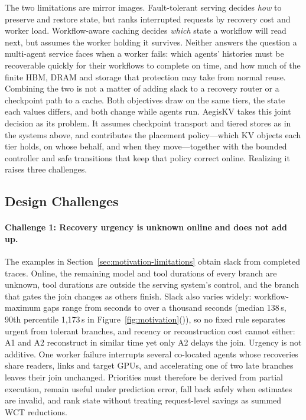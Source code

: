 \label{sec:motivation-long-context}
The two limitations are mirror images. Fault-tolerant serving decides
\emph{how} to preserve and restore state, but ranks interrupted requests
by recovery cost and worker load. Workflow-aware caching decides
\emph{which} state a workflow will read next, but assumes the worker
holding it survives. Neither answers the question a multi-agent service
faces when a worker fails: which agents' histories must be recoverable
quickly for their workflows to complete on time, and how much of the
finite HBM, DRAM and storage that protection may take from normal reuse.
Combining the two is not a matter of adding slack to a recovery router
or a checkpoint path to a cache. Both objectives draw on the same tiers,
the state each values differs, and both change while agents run.
AegisKV takes this joint decision as its problem. It assumes checkpoint
transport and tiered stores as in the systems above, and contributes the
placement policy---which KV objects each tier holds, on whose behalf,
and when they move---together with the bounded controller and safe
transitions that keep that policy correct online. Realizing it raises
three challenges.

\subsection{Design Challenges}
\label{sec:motivation-challenges}

\paragraph{Challenge 1: Recovery urgency is unknown online and does not add up.}
The examples in Section~\ref{sec:motivation-limitations} obtain slack
from completed traces. Online, the remaining model and tool durations of
every branch are unknown, tool durations are outside the serving
system's control, and the branch that gates the join changes as others
finish. Slack also varies widely: workflow-maximum gaps range from
seconds to over a thousand seconds (median 138\,s, 90th percentile
1,173\,s in Figure~\ref{fig:motivation}()),
so no fixed rule separates urgent from tolerant branches, and recency or
reconstruction cost cannot either: A1 and A2 reconstruct in similar time
yet only A2 delays the join. Urgency is not additive. One worker failure
interrupts several co-located agents whose recoveries share readers,
links and target GPUs, and accelerating one of two late branches leaves
their join unchanged. Priorities must therefore be derived from partial
execution, remain useful under prediction error, fall back safely when
estimates are invalid, and rank state without treating request-level
savings as summed WCT reductions.


